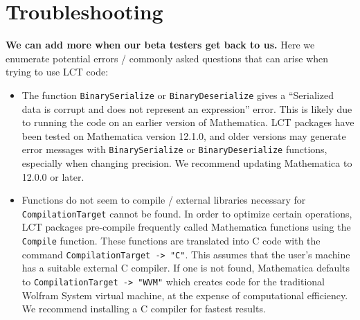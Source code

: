 \documentclass[12pt]{article}
\begin{document}
\section{Troubleshooting}{\textbf{\color{red}We can add more when our beta testers get back to us.}} Here we enumerate potential errors / commonly asked questions that can arise when trying to use LCT code: \begin{itemize}
  \item The function {\tt BinarySerialize} or {\tt BinaryDeserialize} gives a ``Serialized data is corrupt and does not represent an expression'' error.
  \subitem This is likely due to running the code on an earlier version of Mathematica. LCT packages have been tested on Mathematica version 12.1.0, and older versions may generate error messages with {\tt BinarySerialize} or {\tt BinaryDeserialize} functions, especially when changing precision. We recommend updating Mathematica to 12.0.0 or later.
  \item Functions do not seem to compile / external libraries necessary for {\tt CompilationTarget} cannot be found.
  \subitem In order to optimize certain operations,  LCT packages pre-compile frequently called Mathematica functions using the {\tt Compile} function. These functions are translated into C code with the command {\tt CompilationTarget -> "C"}. This assumes that the user's machine has a suitable external C compiler. If one is not found, Mathematica defaults to {\tt CompilationTarget -> "WVM"} which creates code for the traditional Wolfram System virtual machine, at the expense of computational efficiency. We recommend installing a C compiler for fastest results. 
\end{itemize}
\end{document}
